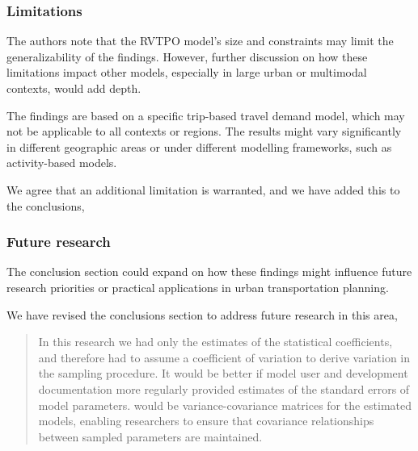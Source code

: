 \documentclass{ar2rc}
\begin{document}
\subsubsection{Limitations}
\RC The authors note that the RVTPO model's size and constraints may limit the
generalizability of the findings. However, further discussion on how these limitations
impact other models, especially in large urban or multimodal contexts, would add
depth.

 The findings are based on a specific trip-based travel demand model, which
may not be applicable to all contexts or regions. The results might vary
significantly in different geographic areas or under different modelling
frameworks, such as activity-based models.

\AR We agree that an additional limitation is warranted, and we have added this to the conclusions,

\begin{quote}
    \DIFaddbegin {}\DIFaddend 
\end{quote}

\subsubsection{Future research}
\RC The conclusion section could expand on how these findings might influence future
research priorities or practical applications in urban transportation planning.

\AR We have revised the conclusions section to address future research in this area,

\begin{quote}
    In this research we had only the estimates of the statistical
coefficients, and therefore had to assume a coefficient of variation to
derive variation in the sampling procedure. It would be better if model
user and development documentation more regularly provided estimates of
the standard errors of model parameters. \DIFdelbegin {}\DIFdelend \DIFaddbegin {}\DIFaddend would be
variance-covariance matrices for the estimated models, enabling
researchers to ensure that covariance relationships between sampled
parameters are maintained. \DIFaddbegin {}\DIFaddend 

\end{quote}
\end{document}
